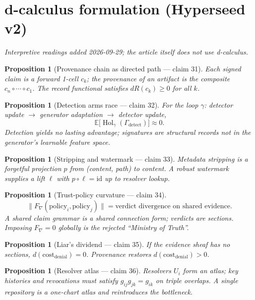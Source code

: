 \documentclass[11pt,a4paper]{article}
\newtheorem{proposition}[definition]{Proposition}
\begin{document}
\section{d-calculus formulation (Hyperseed v2)}
\emph{Interpretive readings added 2026-09-29; the article itself does not use d-calculus.}

\begin{proposition}[Provenance chain as directed path --- claim 31]
Each signed claim is a forward 1-cell $c_k$; the provenance of an artifact is
the composite $c_n\circ\cdots\circ c_1$. The record functional satisfies
$dR(c_k)\ge 0$ for all $k$.
\end{proposition}

\begin{proposition}[Detection arms race --- claim 32]
For the loop $\gamma$: detector update $\to$ generator adaptation $\to$
detector update,
\[
  \mathbb{E}\bigl[\operatorname{Hol}_\gamma(\Gamma_{\mathrm{detect}})\bigr]\approx 0 .
\]
Detection yields no lasting advantage; signatures are structural records
not in the generator's learnable feature space.
\end{proposition}

\begin{proposition}[Stripping and watermark --- claim 33]
Metadata stripping is a forgetful projection $p$ from (content, path) to
content. A robust watermark supplies a lift $\ell$ with $p\circ\ell=\mathrm{id}$
up to resolver lookup.
\end{proposition}

\begin{proposition}[Trust-policy curvature --- claim 34]
\[
  \|F_\nabla(\mathrm{policy}_i,\mathrm{policy}_j)\| = \text{verdict divergence on shared evidence}.
\]
A shared claim grammar is a shared connection form; verdicts are sections.
Imposing $F_\nabla=0$ globally is the rejected ``Ministry of Truth''.
\end{proposition}

\begin{proposition}[Liar's dividend --- claim 35]
If the evidence sheaf has no sections, $d(\mathrm{cost}_{\mathrm{denial}})=0$.
Provenance restores $d(\mathrm{cost}_{\mathrm{denial}})>0$.
\end{proposition}

\begin{proposition}[Resolver atlas --- claim 36]
Resolvers $U_i$ form an atlas; key histories and revocations must satisfy
$g_{ij}g_{jk}=g_{ik}$ on triple overlaps. A single repository is a one-chart
atlas and reintroduces the bottleneck.
\end{proposition}
\end{document}
